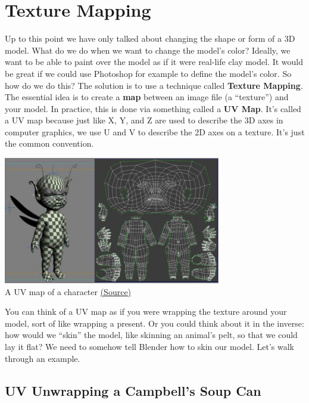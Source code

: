 \documentclass[11pt]{article}
\begin{document}
\section{Texture Mapping}

Up to this point we have only talked about changing the shape or form of a 3D model.  What do we
do when we want to change the model's color?  Ideally, we want to be able to paint over the model
as if it were real-life clay model.  It would be great if we could use Photoshop for example to
define the model's color.  So how do we do this?  The solution is to use a technique called
\textbf{Texture Mapping}.  The essential idea is to create a \textbf{map} between an image file (a
``texture'') and your model.  In practice, this is done via something called a \textbf{UV Map}.
It's called a UV map because just like X, Y, and Z are used to describe the 3D axes in computer
graphics, we use U and V to describe the 2D axes on a texture.  It's just the common convention.

\begin{center}
    \includegraphics[height=15em]{uvmap} \\
    A UV map of a character \href{https://www.pinterest.com/pin/425730970997039889/}{(Source)}
\end{center}

You can think of a UV map as if you were wrapping the texture around your model, sort of like 
wrapping a present.  Or you could think about it in the inverse: how would we ``skin'' the model,
like skinning an animal's pelt, so that we could lay it flat?  We need to somehow tell Blender how 
to skin our model.  Let's walk through an example.

\subsection{UV Unwrapping a Campbell's Soup Can}
\end{document}
